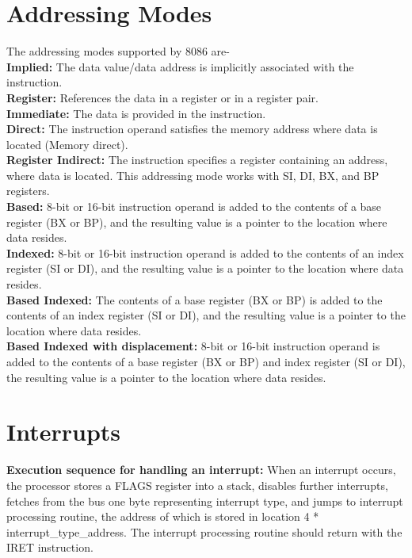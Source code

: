 \documentclass[12pt, a4paper]{scrartcl}
\begin{document}
\section{Addressing Modes}
	The addressing modes supported by 8086 are-\\
	
	\textbf{Implied: }The data value/data address is implicitly associated with the instruction. \\
	
	\textbf{Register: }References the data in a register or in a register pair. \\
	
	\textbf{Immediate: }The data is provided in the instruction.\\
	
	\textbf{Direct: }The instruction operand satisfies the memory address where data is located (Memory direct). \\
	
	\textbf{Register Indirect: }The instruction specifies a register containing an address, where data is located. This addressing mode works with SI, DI, BX, and BP registers.\\
	
	\textbf{Based: }8-bit or 16-bit instruction operand is added to the contents of a base register (BX or BP), and the resulting value is a pointer to the location where data resides. \\
	
	\textbf{Indexed: }8-bit or 16-bit instruction operand is added to the contents of an index register (SI or DI), and the resulting value is a pointer to the location where data resides. \\
	
	\textbf{Based Indexed: }The contents of a base register (BX or BP) is added to the contents of an index register (SI or DI), and the resulting value is a pointer to the location where data resides. \\
	
	\textbf{Based Indexed with displacement: }8-bit or 16-bit instruction operand is added to the contents of a base register (BX or BP) and index register (SI or DI), the resulting value is a pointer to the location where data resides.\\

\section{Interrupts}
	\textbf{Execution sequence for handling an interrupt: }When an interrupt occurs, the processor stores a FLAGS register into a stack, disables further interrupts, fetches from the bus one byte representing interrupt type, and jumps to interrupt processing routine, the address of which is stored in location 4 * interrupt\_type\_address. The interrupt processing routine should return with the IRET instruction. \\
	
\end{document}
